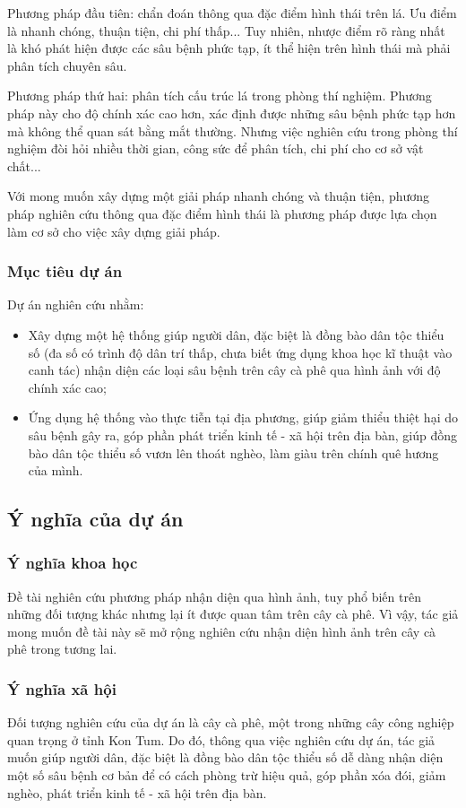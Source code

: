 \documentclass[a4paper,14pt]{extarticle}
\begin{document}
		Phương pháp đầu tiên: chẩn đoán thông qua đặc điểm hình thái trên lá. Ưu điểm là nhanh chóng, thuận tiện, chi phí thấp... Tuy nhiên, nhược điểm rõ ràng nhất là khó phát hiện được các sâu bệnh phức tạp, ít thể hiện trên hình thái mà phải phân tích chuyên sâu.
		
		Phương pháp thứ hai: phân tích cấu trúc lá trong phòng thí nghiệm. Phương pháp này cho độ chính xác cao hơn, xác định được những sâu bệnh phức tạp hơn mà không thể quan sát bằng mắt thường. Nhưng việc nghiên cứu trong phòng thí nghiệm đòi hỏi nhiều thời gian, công sức để phân tích, chi phí cho cơ sở vật chất...
		
		Với mong muốn xây dựng một giải pháp nhanh chóng và thuận tiện, phương pháp nghiên cứu thông qua đặc điểm hình thái là phương pháp được lựa chọn làm cơ sở cho việc xây dựng giải pháp.

		\subsubsection{Mục tiêu dự án}
		Dự án nghiên cứu nhằm:
		\begin{itemize}
			\item Xây dựng một hệ thống giúp người dân, đặc biệt là đồng bào dân tộc thiểu số (đa số có trình độ dân trí thấp, chưa biết ứng dụng khoa học kĩ thuật vào canh tác) nhận diện các loại sâu bệnh trên cây cà phê qua hình ảnh với độ chính xác cao;
			\item Ứng dụng hệ thống vào thực tiễn tại địa phương, giúp giảm thiểu thiệt hại do sâu bệnh gây ra, góp phần phát triển kinh tế - xã hội trên địa bàn, giúp đồng bào dân tộc thiểu số vươn lên thoát nghèo, làm giàu trên chính quê hương của mình.
		\end{itemize}
			
	\subsection{Ý nghĩa của dự án}
		\subsubsection{Ý nghĩa khoa học}
		Đề tài nghiên cứu phương pháp nhận diện qua hình ảnh, tuy phổ biến trên những đối tượng khác nhưng lại ít được quan tâm trên cây cà phê. Vì vậy, tác giả mong muốn đề tài này sẽ mở rộng nghiên cứu nhận diện hình ảnh trên cây cà phê trong tương lai.

		\subsubsection{Ý nghĩa xã hội}
		Đối tượng nghiên cứu của dự án là cây cà phê, một trong những cây công nghiệp quan trọng ở tỉnh Kon Tum. Do đó, thông qua việc nghiên cứu dự án, tác giả muốn giúp người dân, đặc biệt là đồng bào dân tộc thiểu số dễ dàng nhận diện một số sâu bệnh cơ bản để có cách phòng trừ hiệu quả, góp phần xóa đói, giảm nghèo, phát triển kinh tế - xã hội trên địa bàn.
\end{document}
